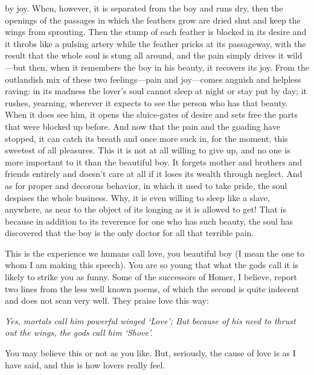 by joy. When, however, it is separated from the boy and runs
dry, then the openings of the passages in which the feathers grow are
dried shut and keep the wings from sprouting. Then the stump of each
feather is blocked in its desire and it throbs like a pulsing artery
while the feather pricks at its passageway, with the result that the
whole soul is stung all around, and the pain simply drives it wild---but
then, when it remembers the boy in his beauty, it recovers its joy. From
the outlandish mix of these two feelings---pain and joy---comes anguish
and helpless raving: in its madness the lover’s soul cannot 
sleep at night or stay put by day; it rushes, yearning, wherever it
expects to see the person who has that beauty. When it does see him, it
opens the sluice-gates of desire and sets free the parts that were
blocked up before. And now that the pain and the goading have stopped,
it can catch its breath and once more suck in, for the moment, this
sweetest of all pleasures. This it is not at all willing to give up, and
no one is more important to it than the beautiful boy.
It forgets mother and brothers and friends entirely and doesn’t care at
all if it loses its wealth through neglect. And as for proper and
decorous behavior, in which it used to take pride, the soul despises the
whole business. Why, it is even willing to sleep like a slave, anywhere,
as near to the object of its longing as it is allowed to get! That is
because in addition to its reverence for one who has such beauty, the 
soul has discovered that the boy is the only doctor for all that
terrible pain.

This is the experience we humans call love, you beautiful boy (I mean
the one to whom I am making this
speech). You are so
young that what the gods call it is likely to strike you as funny. Some
of the successors of Homer, I believe, report two lines from the less
well known poems, of which the second is quite indecent and does not
scan very well. They praise love this way:

\startpoem
{\em Yes, mortals call him powerful winged ‘Love’;
But because of his need to thrust out the wings,
\quad the gods call him ‘Shove’.}
\stoppoem

You may believe this or not as you like. But, seriously, the cause of
love is as I have said, and this is how lovers really feel.

